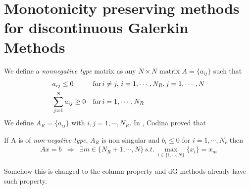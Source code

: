 \chapter{Monotonicity preserving methods for discontinuous Galerkin Methods}

We define a \textit{nonnegative type} matrix as any $N\times N$ matrix $A=\{a_{ij}\}$ such that
\begin{align}
&a_{ij} \leq 0  & & {\rm for}\, i\neq j, \, i=1,\cdots,N_R, j=1,\cdots,N \\
&\sum_{j=1}^{N} a_{ij} \geq 0 & &{\rm for}\, i=1,\cdots,N_R
\end{align}
We define $A_R = \{a_{ij}\}$ with $i,j=1,\cdots, N_R$.
In \cite{codina_discontinuity-capturing_1993}, Codina proved that
\begin{theorem}
	If A is of \textit{non-negative type}, $A_R$ is non singular and $b_i\leq 0$ for $i=1,\cdots,N_r$ then 
	\begin{align*}
	Ax=b & \Rightarrow & \exists m\in \{N_R+1,\cdots,N\} \, s.t. \, \max_{i\in\{1,\cdots,N\}}\{x_i\}=x_m
	\end{align*}
\end{theorem}

Somehow this is changed to the column property and dG methods already have such property.